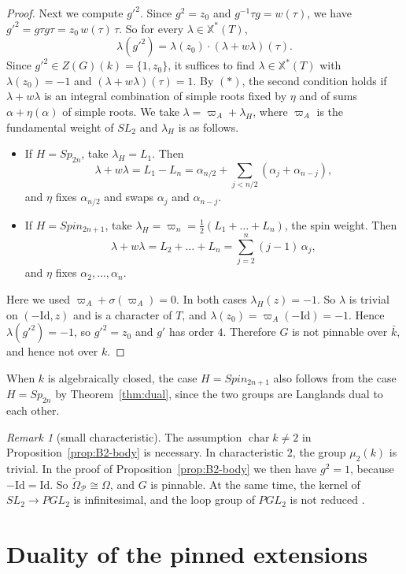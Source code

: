 \documentclass[psamsfonts]{amsart}
\theoremstyle{definition}
\theoremstyle{remark}
\newtheorem{rem}[thm]{Remark}
\numberwithin{equation}{section}
\newcommand{\X}{\mathbb{X}}
\newcommand{\ra}{\rightarrow}
\newcommand{\tOm}{\widetilde{\Omega}}
\DeclareMathOperator{\chara}{char}
\newcommand\cP{\mathcal{P}}
\numberwithin{equation}{section}
\newcommand{\Om}{\Omega}
\newcommand{\Id}{\mathrm{Id}}
\theoremstyle{plain}
\begin{document}
\begin{proof}
Next we compute $g'^2$. Since $g^2=z_0$ and $g^{-1}\tau g=w(\tau)$, we have $g'^2=g\tau g\tau=z_0\,w(\tau)\,\tau$. So for every $\lambda\in\X^*(T)$,
\[
\lambda(g'^2)=\lambda(z_0)\cdot(\lambda+w\lambda)(\tau).
\]
Since $g'^2\in Z(G)(k)=\{1,z_0\}$, it suffices to find $\lambda\in\X^*(T)$ with $\lambda(z_0)=-1$ and $(\lambda+w\lambda)(\tau)=1$. By $(*)$, the second condition holds if $\lambda+w\lambda$ is an integral combination of simple roots fixed by $\eta$ and of sums $\alpha+\eta(\alpha)$ of simple roots. We take $\lambda=\varpi_A+\lambda_H$, where $\varpi_A$ is the fundamental weight of $SL_2$ and $\lambda_H$ is as follows.
\begin{itemize}
\item If $H=Sp_{2n}$, take $\lambda_H=L_1$. Then
\[
\lambda+w\lambda=L_1-L_n=\alpha_{n/2}+\sum_{j<n/2}(\alpha_j+\alpha_{n-j}),
\]
and $\eta$ fixes $\alpha_{n/2}$ and swaps $\alpha_j$ and $\alpha_{n-j}$.
\item If $H=Spin_{2n+1}$, take $\lambda_H=\varpi_n=\frac12(L_1+\dots+L_n)$, the spin weight. Then
\[
\lambda+w\lambda=L_2+\dots+L_n=\sum_{j=2}^n(j-1)\,\alpha_j,
\]
and $\eta$ fixes $\alpha_2,\dots,\alpha_n$.
\end{itemize}
Here we used $\varpi_A+\sigma(\varpi_A)=0$. In both cases $\lambda_H(z)=-1$. So $\lambda$ is trivial on $(-\Id,z)$ and is a character of $T$, and $\lambda(z_0)=\varpi_A(-\Id)=-1$. Hence $\lambda(g'^2)=-1$, so $g'^2=z_0$ and $g'$ has order $4$. Therefore $G$ is not pinnable over $\bar k$, and hence not over $k$.
\end{proof}

When $k$ is algebraically closed, the case $H=Spin_{2n+1}$ also follows from the case $H=Sp_{2n}$ by Theorem~\ref{thm:dual}, since the two groups are Langlands dual to each other.

\begin{rem}[small characteristic]\label{rem:char2}
The assumption $\chara k\neq2$ in Proposition~\ref{prop:B2-body} is necessary. In characteristic $2$, the group $\mu_2(k)$ is trivial. In the proof of Proposition~\ref{prop:B2-body} we then have $g^2=1$, because $-\Id=\Id$. So $\tOm_{\cP}\cong\Om$, and $G$ is pinnable. At the same time, the kernel of $SL_2\ra PGL_2$ is infinitesimal, and the loop group of $PGL_2$ is not reduced \cite[Remarks~6.3 and~6.4]{PR08}.
\end{rem}


\section{Duality of the pinned extensions}\label{sec:duality}
\end{document}
